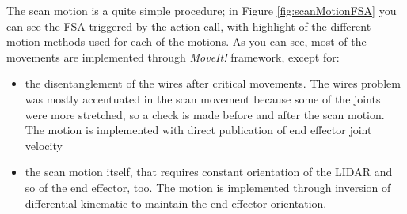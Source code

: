 The scan motion is a quite simple procedure; in Figure \ref{fig:scanMotionFSA} you can see the \ac{FSA} triggered by the action call, with highlight of the different motion methods used for each of the motions. As you can see, most of the movements are implemented through \textit{MoveIt!} framework, except for:
\begin{itemize}
	\item the disentanglement of the wires after critical movements. The wires problem was mostly accentuated in the scan movement because some of the joints were more stretched, so a check is made before and after the scan motion. The motion is implemented with direct publication of end effector joint velocity
	\item the scan motion itself, that requires constant orientation of the \ac{LIDAR} and so of the end effector, too. The motion is implemented through inversion of differential kinematic to maintain the end effector orientation.
\end{itemize}
